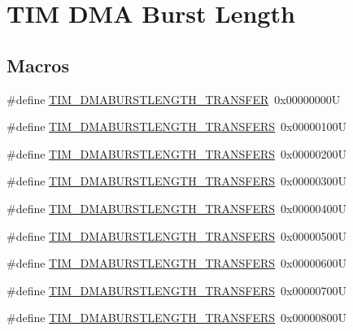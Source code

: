 \hypertarget{group___t_i_m___d_m_a___burst___length}{}\section{T\+IM D\+MA Burst Length}
\label{group___t_i_m___d_m_a___burst___length}
\subsection*{Macros}
\begin{DoxyCompactItemize}
\item 
\#define \hyperlink{group___t_i_m___d_m_a___burst___length_ga74f07b4a10022d71f31ec6e1b2b69276}{T\+I\+M\+\_\+\+D\+M\+A\+B\+U\+R\+S\+T\+L\+E\+N\+G\+T\+H\+\_\+T\+R\+A\+N\+S\+F\+ER}~0x00000000U
\item 
\#define \hyperlink{group___t_i_m___d_m_a___burst___length_gab114592091a00e0a6b9ae464485bd7bb}{T\+I\+M\+\_\+\+D\+M\+A\+B\+U\+R\+S\+T\+L\+E\+N\+G\+T\+H\+\_\+T\+R\+A\+N\+S\+F\+E\+RS}~0x00000100U
\item 
\#define \hyperlink{group___t_i_m___d_m_a___burst___length_gad91c14f0930803593ecdbd98002fea0a}{T\+I\+M\+\_\+\+D\+M\+A\+B\+U\+R\+S\+T\+L\+E\+N\+G\+T\+H\+\_\+T\+R\+A\+N\+S\+F\+E\+RS}~0x00000200U
\item 
\#define \hyperlink{group___t_i_m___d_m_a___burst___length_ga9ada9605ae6ff6e4ada9701263bef812}{T\+I\+M\+\_\+\+D\+M\+A\+B\+U\+R\+S\+T\+L\+E\+N\+G\+T\+H\+\_\+T\+R\+A\+N\+S\+F\+E\+RS}~0x00000300U
\item 
\#define \hyperlink{group___t_i_m___d_m_a___burst___length_ga740a6446c0a517cc3e235fddee45fef5}{T\+I\+M\+\_\+\+D\+M\+A\+B\+U\+R\+S\+T\+L\+E\+N\+G\+T\+H\+\_\+T\+R\+A\+N\+S\+F\+E\+RS}~0x00000400U
\item 
\#define \hyperlink{group___t_i_m___d_m_a___burst___length_ga905c206d2a028e3fb92bcab8f9f7c869}{T\+I\+M\+\_\+\+D\+M\+A\+B\+U\+R\+S\+T\+L\+E\+N\+G\+T\+H\+\_\+T\+R\+A\+N\+S\+F\+E\+RS}~0x00000500U
\item 
\#define \hyperlink{group___t_i_m___d_m_a___burst___length_gae75055ac13b73baf9326f1d6157853a7}{T\+I\+M\+\_\+\+D\+M\+A\+B\+U\+R\+S\+T\+L\+E\+N\+G\+T\+H\+\_\+T\+R\+A\+N\+S\+F\+E\+RS}~0x00000600U
\item 
\#define \hyperlink{group___t_i_m___d_m_a___burst___length_gac6b24f5b7d9e1968b4bfcaeb24e718fc}{T\+I\+M\+\_\+\+D\+M\+A\+B\+U\+R\+S\+T\+L\+E\+N\+G\+T\+H\+\_\+T\+R\+A\+N\+S\+F\+E\+RS}~0x00000700U
\item 
\#define \hyperlink{group___t_i_m___d_m_a___burst___length_ga73fff75a3f0247c61a84a42e8cb83572}{T\+I\+M\+\_\+\+D\+M\+A\+B\+U\+R\+S\+T\+L\+E\+N\+G\+T\+H\+\_\+T\+R\+A\+N\+S\+F\+E\+RS}~0x00000800U

\end{DoxyCompactItemize}
